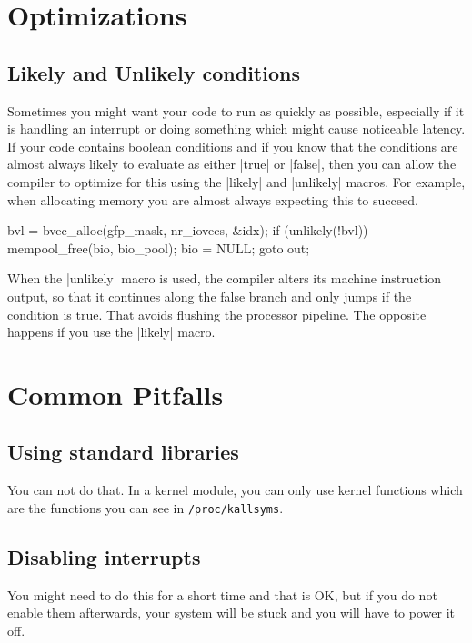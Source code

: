 \documentclass[10pt, oneside]{book}
\begin{document}
\section{Optimizations}
\label{sec:optimization}
\subsection{Likely and Unlikely conditions}
\label{sec:likely_unlikely}
Sometimes you might want your code to run as quickly as possible, especially if it is handling an interrupt or doing something which might cause noticeable latency.
If your code contains boolean conditions and if you know that the conditions are almost always likely to evaluate as either \cpp|true| or \cpp|false|,
then you can allow the compiler to optimize for this using the \cpp|likely| and \cpp|unlikely| macros.
For example, when allocating memory you are almost always expecting this to succeed.

\begin{code}
bvl = bvec_alloc(gfp_mask, nr_iovecs, &idx);
if (unlikely(!bvl)) {
    mempool_free(bio, bio_pool);
    bio = NULL;
    goto out;
}
\end{code}

When the \cpp|unlikely| macro is used, the compiler alters its machine instruction output, so that it continues along the false branch and only jumps if the condition is true.
That avoids flushing the processor pipeline.
The opposite happens if you use the \cpp|likely| macro.

\section{Common Pitfalls}
\label{sec:opitfall}

\subsection{Using standard libraries}
\label{sec:using_stdlib}
You can not do that.
In a kernel module, you can only use kernel functions which are the functions you can see in \verb|/proc/kallsyms|.

\subsection{Disabling interrupts}
\label{sec:disabling_interrupts}
You might need to do this for a short time and that is OK, but if you do not enable them afterwards, your system will be stuck and you will have to power it off.
\end{document}
